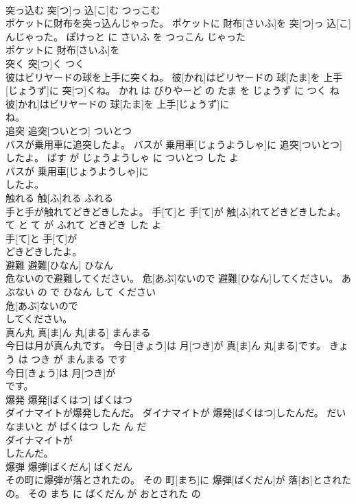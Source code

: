 \documentclass[8pt]{extreport}
\begin{document}
\begin{CJK}{UTF8}{min}
\\	突っ込む	突[つ]っ 込[こ]む	つっこむ	
\\	ポケットに財布を突っ込んじゃった。	ポケットに 財布[さいふ]を 突[つ]っ 込[こ]んじゃった。	ぽけっと に さいふ を つっこん じゃった	
\\	ポケットに 財布[さいふ]を
\\	突く	突[つ]く	つく	
\\	彼はビリヤードの球を上手に突くね。	彼[かれ]はビリヤードの 球[たま]を 上手[じょうず]に 突[つ]くね。	かれ は びりやーど の たま を じょうず に つく ね	
\\	彼[かれ]はビリヤードの 球[たま]を 上手[じょうず]に
\\	ね。			
\\	追突	追突[ついとつ]	ついとつ	
\\	バスが乗用車に追突したよ。	バスが 乗用車[じょうようしゃ]に 追突[ついとつ]したよ。	ばす が じょうようしゃ に ついとつ した よ	
\\	バスが 乗用車[じょうようしゃ]に
\\	したよ。			
\\	触れる	触[ふ]れる	ふれる	
\\	手と手が触れてどきどきしたよ。	手[て]と 手[て]が 触[ふ]れてどきどきしたよ。	て と て が ふれて どきどき した よ	
\\	手[て]と 手[て]が
\\	どきどきしたよ。			
\\	避難	避難[ひなん]	ひなん	
\\	危ないので避難してください。	危[あぶ]ないので 避難[ひなん]してください。	あぶない の で ひなん して ください	
\\	危[あぶ]ないので
\\	してください。			
\\	真ん丸	真[ま]ん 丸[まる]	まんまる	
\\	今日は月が真ん丸です。	今日[きょう]は 月[つき]が 真[ま]ん 丸[まる]です。	きょう は つき が まんまる です	
\\	今日[きょう]は 月[つき]が
\\	です。			
\\	爆発	爆発[ばくはつ]	ばくはつ	
\\	ダイナマイトが爆発したんだ。	ダイナマイトが 爆発[ばくはつ]したんだ。	だいなまいと が ばくはつ した ん だ	
\\	ダイナマイトが
\\	したんだ。			
\\	爆弾	爆弾[ばくだん]	ばくだん	
\\	その町に爆弾が落とされたの。	その 町[まち]に 爆弾[ばくだん]が 落[お]とされたの。	その まち に ばくだん が おとされた の	

\end{CJK}
\end{document}
